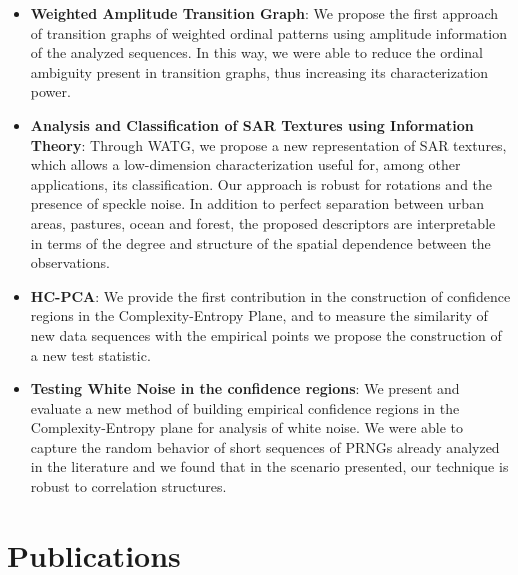 \begin{itemize}
    \item[] \textbf{Weighted Amplitude Transition Graph}: We propose the first approach of transition graphs of weighted ordinal patterns using amplitude information of the analyzed sequences.
    In this way, we were able to reduce the ordinal ambiguity present in transition graphs, thus increasing its characterization power.
    
    \item[] \textbf{Analysis and Classification of SAR Textures using Information Theory}: Through WATG, we propose a new representation of SAR textures, which allows a low-dimension characterization useful for, among other applications, its classification.
    Our approach is robust for rotations and the presence of speckle noise.
    In addition to perfect separation between urban areas, pastures, ocean and forest, the proposed descriptors are interpretable in terms of the degree and structure of the spatial dependence between the observations.
    \item[] \textbf{HC-PCA}: We provide the first contribution in the construction of confidence regions in the Complexity-Entropy Plane, and to measure the similarity of new data sequences with the empirical points we propose the construction of a new test statistic.
    \item[] \textbf{Testing White Noise in the confidence regions}: We present and evaluate a new method of building empirical confidence regions in the Complexity-Entropy plane for analysis of white noise.
    We were able to capture the random behavior of short sequences of PRNGs already analyzed in the literature and we found that in the scenario presented, our technique is robust to correlation structures.
\end{itemize}

\section{Publications}

